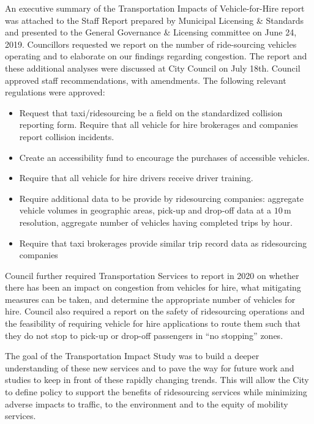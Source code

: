 \documentclass[]{trbunofficial_bdit_final}
\begin{document}
An executive summary of the Transportation Impacts of Vehicle-for-Hire report was
attached to the Staff Report prepared by Municipal Licensing \& Standards and
presented to the General Governance \& Licensing committee on June 24, 2019.
Councillors requested we report on the number of ride-sourcing vehicles
operating and to elaborate on our findings regarding congestion. The report and
these additional analyses were discussed at City Council on July 18th.
Council approved staff recommendations, with amendments. The following relevant
regulations were approved:

\begin{itemize}
\tightlist
\item
  Request that taxi/ridesourcing be a field on the standardized collision
  reporting form. Require that all vehicle for hire brokerages and companies
  report collision incidents.
\item
  Create an accessibility fund to encourage the purchases of accessible
  vehicles.
\item
  Require that all vehicle for hire drivers receive driver training.
\item
  Require additional data to be provide by ridesourcing companies: aggregate
  vehicle volumes in geographic areas, pick-up and drop-off data at a
  \(10\,\mathrm{m}\) resolution, aggregate number of vehicles having completed
  trips by hour.
\item
  Require that taxi brokerages provide similar trip record data as ridesourcing
  companies
\end{itemize}

Council further required Transportation Services to report in 2020 on whether
there has been an impact on congestion from vehicles for hire, what mitigating
measures can be taken, and determine the appropriate number of vehicles for
hire. Council also required a report on the safety of ridesourcing operations
and the feasibility of requiring vehicle for hire applications to route them
such that they do not stop to pick-up or drop-off passengers in ``no stopping''
zones.

The goal of the Transportation Impact Study was to build a deeper understanding
of these new services and to pave the way for future work and studies to keep
in front of these rapidly changing trends. This will allow the City to define
policy to support the benefits of ridesourcing services while minimizing
adverse impacts to traffic, to the environment and to the equity of mobility
services.
\end{document}

